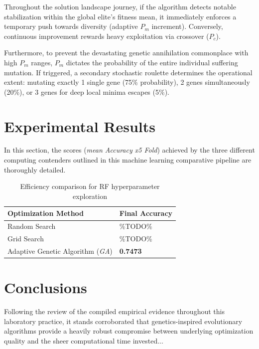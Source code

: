 \documentclass[12pt, a4paper]{article}
\begin{document}
Throughout the solution landscape journey, if the algorithm detects notable stabilization within the global elite's fitness mean, it immediately enforces a temporary push towards diversity (adaptive $P_m$ increment). Conversely, continuous improvement rewards heavy exploitation via crossover ($P_c$).

Furthermore, to prevent the devastating genetic annihilation commonplace with high $P_m$ ranges, $P_m$ dictates the probability of the entire individual suffering mutation. If triggered, a secondary stochastic roulette determines the operational extent: mutating exactly 1 single gene (75\% probability), 2 genes simultaneously (20\%), or 3 genes for deep local minima escapes (5\%).

\section{Experimental Results}

In this section, the scores (\textit{mean Accuracy x5 Fold}) achieved by the three different computing contenders outlined in this machine learning comparative pipeline are thoroughly detailed.

\begin{table}[H]
\centering
\caption{Efficiency comparison for RF hyperparameter exploration}
\begin{tabular}{@{}ll@{}}
\toprule
\textbf{Optimization Method}       & \textbf{Final Accuracy} \\ \midrule
Random Search & \%TODO\% \\
Grid Search  & \%TODO\% \\
Adaptive Genetic Algorithm (\textit{GA}) & \textbf{0.7473} \\ 
\bottomrule
\end{tabular}
\end{table}

\section{Conclusions}

Following the review of the compiled empirical evidence throughout this laboratory practice, it stands corroborated that genetics-inspired evolutionary algorithms provide a heavily robust compromise between underlying optimization quality and the sheer computational time invested...
\end{document}
